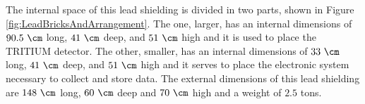 The internal space of this lead shielding is divided in two parts, shown in Figure \ref{fig:LeadBricksAndArrangement}. The one, larger, has an internal dimensions of $90.5~\cm$ long, $41~\cm$ deep, and $51~\cm$ high and it is used to place the TRITIUM detector. The other, smaller, has an internal dimensions of $33~\cm$ long, $41~\cm$ deep, and $51~\cm$ high and it serves to place the electronic system necessary to collect and store data. The external dimensions of this lead shielding are $148~\cm$ long, $60~\cm$ deep and $70~\cm$ high and a weight of $2.5$ tons.